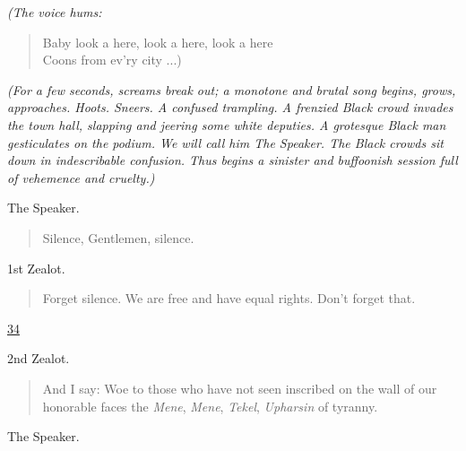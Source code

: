 \documentclass[letterpaper,article,12pt,oneside,notitlepage]{memoir}
\begin{document}
\textit{(The voice hums:}

\begin{verse}
\hspace{1cm} Baby look a here, look a here, look a here \\
\hspace{1cm} Coons from ev'ry city ...) \\
\end{verse}

\textit{(For a few seconds, screams break out; a monotone and brutal song begins, grows, approaches. Hoots. Sneers. A confused trampling. A frenzied Black crowd invades the town hall, slapping and jeering some white deputies. A grotesque Black man gesticulates on the podium. We will call him The Speaker. The Black crowds sit down in indescribable confusion. Thus begins a sinister and buffoonish session full of vehemence and cruelty.)}

\begin{center}The Speaker.\end{center}

\begin{verse}
Silence, Gentlemen, silence. \\
\end{verse}

\begin{center}1st Zealot.\end{center}

\begin{verse}
\indent Forget silence. We are free and have equal rights. Don't forget that. \\
\end{verse}

\clearpage

\href{http://cesaire.elotroalex.com/chiens/chiens/p034.html}{34}

\begin{center}2nd Zealot.\end{center}

\begin{verse}
\indent And I say: Woe to those who have not seen inscribed on the wall of our honorable faces the \textit{Mene}, \textit{Mene}, \textit{Tekel}, \textit{Upharsin} of tyranny. \\
\end{verse}

\begin{center}The Speaker.\end{center}
\end{document}
